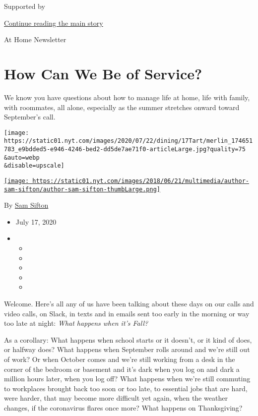 Supported by

\protect\hyperlink{after-sponsor}{Continue reading the main story}

At Home Newsletter

\hypertarget{how-can-we-be-of-service}{%
\section{How Can We Be of Service?}\label{how-can-we-be-of-service}}

We know you have questions about how to manage life at home, life with
family, with roommates, all alone, especially as the summer stretches
onward toward September's call.

\texttt{[image: https://static01.nyt.com/images/2020/07/22/dining/17Tart/merlin\_174651783\_e9bdded5-e946-4246-bed2-dd5de7ae71f0-articleLarge.jpg?quality=75\\\&auto=webp\\\&disable=upscale]}

\href{https://www.nytimes.com/by/sam-sifton}{\texttt{[image: https://static01.nyt.com/images/2018/06/21/multimedia/author-sam-sifton/author-sam-sifton-thumbLarge.png]}}

By \href{https://www.nytimes.com/by/sam-sifton}{Sam Sifton}

\begin{itemize}
\item
  July 17, 2020
\item
  \begin{itemize}
  \item
  \item
  \item
  \item
  \item
  \end{itemize}
\end{itemize}

Welcome. Here's all any of us have been talking about these days on our
calls and video calls, on Slack, in texts and in emails sent too early
in the morning or way too late at night: \emph{What happens when it's
Fall?}

As a corollary: What happens when school starts or it doesn't, or it
kind of does, or halfway does? What happens when September rolls around
and we're still out of work? Or when October comes and we're still
working from a desk in the corner of the bedroom or basement and it's
dark when you log on and dark a million hours later, when you log off?
What happens when we're still commuting to workplaces brought back too
soon or too late, to essential jobs that are hard, were harder, that may
become more difficult yet again, when the weather changes, if the
coronavirus flares once more? What happens on Thanksgiving?

